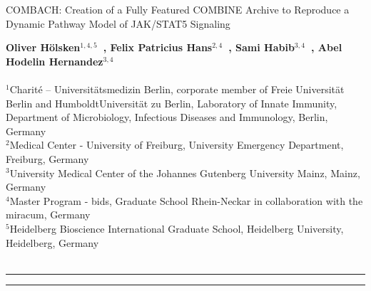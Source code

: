 \begin{titlepage}
\vspace{6cm}
\begin{centering}


{\noindent\huge{COMBACH: Creation of a Fully Featured COMBINE Archive to Reproduce a Dynamic Pathway Model of JAK/STAT5 Signaling}}

\end{centering}


\vspace{30pt}
\noindent\textbf{Oliver H\"olsken$^{1,4,5}$~, Felix Patricius Hans$^{2,4}$~, Sami Habib$^{3,4}$~, Abel Hodelin Hernandez$^{3,4}$~}
\\ \\
	\small $^{1}$Charité – Universit\"atsmedizin Berlin, corporate member of Freie Universit\"at Berlin and HumboldtUniversit\"at zu Berlin, Laboratory of Innate Immunity, Department of Microbiology, Infectious Diseases and Immunology, Berlin, Germany \\
	\small $^{2}$Medical Center - University of Freiburg, University Emergency Department, Freiburg, Germany \\
	\small $^{3}$University Medical Center of the Johannes Gutenberg University Mainz, Mainz, Germany \\
	\small $^{4}$Master Program - \ac{bids}, Graduate School Rhein-Neckar in collaboration with the \ac{miracum}, Germany \\
	\small $^{5}$Heidelberg Bioscience International Graduate School, Heidelberg University, Heidelberg, Germany \\
	\\


\newpage
\hrule

 \hspace{10pt}

\noindent{}

\hrule
\end{titlepage}
